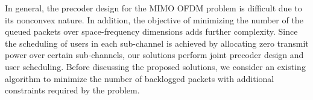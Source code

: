In general, the precoder design for the \ac{MIMO} \ac{OFDM} problem is difficult due to its nonconvex nature. In addition, the objective of minimizing the number of the queued packets over space-frequency dimensions adds further complexity. Since the scheduling of users in each sub-channel is achieved by allocating zero transmit power over certain sub-channels, our solutions perform joint precoder design and user scheduling. Before discussing the proposed solutions, we consider an existing algorithm to minimize the number of backlogged packets with additional constraints required by the problem.